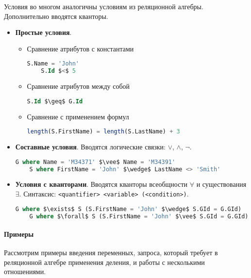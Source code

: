 Условия во многом аналогичны условиям из реляционной алгебры. Дополнительно вводятся кванторы.

\begin{itemize}
	\item \textbf{Простые условия}.
	      \begin{itemize}
		      \item Сравнение атрибутов с константами
		            \begin{lstlisting}[language=SQL, mathescape=true]
    S.Name = 'John'
    S.Id $<$ 5
                \end{lstlisting}
		      \item Сравнение атрибутов между собой
		            \begin{lstlisting}[language=SQL, mathescape=true]
    S.Id $\geq$ G.Id
                \end{lstlisting}
		      \item Сравнение с применением формул
		            \begin{lstlisting}[language=SQL, mathescape=true]
    length(S.FirstName) = length(S.LastName) + 3
                \end{lstlisting}
	      \end{itemize}
	\item \textbf{Составные условия}. Вводятся логические связки: $\vee$, $\wedge$,
	      $\neg$.
	      \begin{lstlisting}[language=SQL, mathescape=true]
    G where Name = 'M34371' $\vee$ Name = 'M34391'
    S where FirstName = 'John' $\wedge$ LastName <> 'Smith'
        \end{lstlisting}
	\item \textbf{Условия с кванторами}. Вводятся кванторы всеобщности $\forall$ и существования
	      $\exists$. Синтаксис: \texttt{<quantifier> <variable> (<condition>)}.
	      \begin{lstlisting}[language=SQL, mathescape=true]
    G where $\exists$ S (S.FirstName = 'John' $\wedge$ S.GId = G.GId)
    G where $\forall$ S (S.FirstName = 'John' $\vee$ S.GId = G.GId)
        \end{lstlisting}
\end{itemize}

\paragraph{Примеры}

Рассмотрим примеры введения переменных, запроса, который требует в реляционной алгебре применения
деления, и работы с несколькими отношениями.

